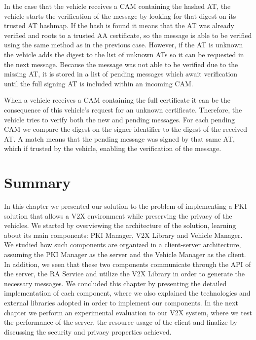 In the case that the vehicle receives a CAM containing the hashed AT, the vehicle starts the verification of the message by looking for that digest on its trusted AT hashmap. If the hash is found it means that the AT was already verified and roots to a trusted AA certificate, so the message is able to be verified using the same method as in the previous case. However, if the AT is unknown the vehicle adds the digest to the list of unknown ATs so it can be requested in the next message. Because the message was not able to be verified due to the missing AT, it is stored in a list of pending messages which await verification until the full signing AT is included within an incoming CAM.

When a vehicle receives a CAM containing the full certificate it can be the consequence of this vehicle's request for an unknown certificate. Therefore, the vehicle tries to verify both the new and pending messages. For each pending CAM we compare the digest on the signer identifier to the digest of the received AT. A match means that the pending message was signed by that same AT, which if trusted by the vehicle, enabling the verification of the message.

\section{Summary}
In this chapter we presented our solution to the problem of implementing a PKI solution that allows a V2X environment while preserving the privacy of the vehicles. We started by overviewing the architecture of the solution, learning about its main components: PKI Manager, V2X Library and Vehicle Manager. We studied how such components are organized in a client-server architecture, assuming the PKI Manager as the server and the Vehicle Manager as the client. In addition, we seen that these two components communicate through the API of the server, the RA Service and utilize the V2X Library in order to generate the necessary messages. We concluded this chapter by presenting the detailed implementation of each component, where we also explained the technologies and external libraries adopted in order to implement our components. In the next chapter we perform an experimental evaluation to our V2X system, where we test the performance of the server, the resource usage of the client and finalize by discussing the security and privacy properties achieved. 

 
